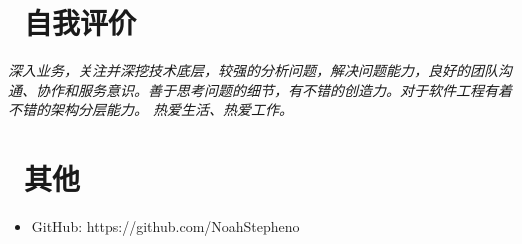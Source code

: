 \documentclass{resume}
\begin{document}
\section{\faHeartO\ 自我评价}
\textit{深入业务，关注并深挖技术底层，较强的分析问题，解决问题能力，良好的团队沟通、协作和服务意识。善于思考问题的细节，有不错的创造力。对于软件工程有着不错的架构分层能力。
热爱生活、热爱工作。}

\section{\faInfo\ 其他}
\begin{itemize}[parsep=0.5ex]
  \item GitHub: https://github.com/NoahStepheno
\end{itemize}

%
%
\end{document}
